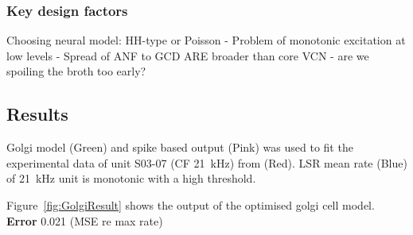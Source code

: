 \medskip{}


\subsubsection{Key design factors}

Choosing neural model: HH-type or Poisson
 - Problem of monotonic excitation at low levels
 - Spread of ANF to GCD ARE broader than core VCN
  - are we spoiling the broth too early? 



\newpage






\clearpage
\subsection{Results}

Golgi model (Green) and spike based output (Pink) was used to
fit the experimental data of unit S03-07 (CF 21~kHz) from
\citep{GhoshalKim:1996} (Red).  LSR mean rate (Blue) of 21~kHz unit is
monotonic with a high threshold.

Figure~\ref{fig:GolgiResult} shows the output of the optimised golgi cell model.
\textbf{Error} 0.021 (MSE re max rate)


